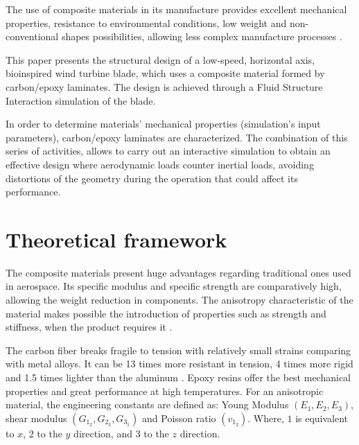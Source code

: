 The use of composite materials in its manufacture provides excellent mechanical properties, resistance to environmental conditions, low weight and non-conventional shapes possibilities, allowing less complex manufacture processes \cite{Mish} .

This paper presents the structural design of a low-speed, horizontal axis, bioinspired wind turbine blade, which uses a composite material formed by carbon/epoxy laminates. The design is achieved through a Fluid Structure Interaction simulation of the blade. 

In order to determine materials’ mechanical properties (simulation’s input parameters), carbon/epoxy laminates are characterized. The combination of this series of activities, allows to carry out an interactive simulation to obtain an effective design where aerodynamic loads counter inertial loads, avoiding distortions of the geometry during the operation that could affect its performance.  

\section{Theoretical framework}
The composite materials present huge advantages regarding traditional ones used in aerospace. Its specific modulus and specific strength are comparatively high, allowing the weight reduction in components. The anisotropy characteristic of the material makes possible the introduction of properties such as strength and stiffness, when the product requires it \cite{hull}.

The carbon fiber breaks fragile to tension with relatively small strains comparing with metal alloys. It can be 13 times more resistant in tension, 4 times more rigid and 1.5 times lighter than the aluminum \cite{lin}. Epoxy resins offer the best mechanical properties and great performance at high temperatures. 
\label{sec:1}
For an anisotropic material, the engineering constants are defined as: Young Modulus $(E_1,E_2,E_3)$, shear modulus $(G_1_2,G_2_3,G_3_1)$ and Poisson ratio $(v_1_2)$. Where, $1$ is equivalent to $x$, $2$ to the $y$ direction, and $3$ to the $z$ direction.

